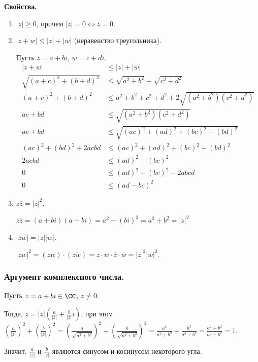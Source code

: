 \textbf{Свойства.}

\begin{enumerate}[label={\arabic*°.}]
    \item $|z| \geq 0$, причем $|z| = 0 \iff z = 0$.
    \item $|z + w| \leq |z| + |w|$ (неравенство треугольника).

    Пусть $z = a + bi$, $w = c + di$.
    \begin{align*}
        |z + w| &\leq |z| + |w| \\
        \sqrt{(a + c)^2 + (b + d)^2} &\leq \sqrt{a^2 + b^2} + \sqrt{c^2 + d^2} \\
        (a + c)^2 + (b + d)^2 &\leq a^2 + b^2 + c^2 + d^2 + 2\sqrt{(a^2 + b^2)(c^2 + d^2)} \\
        ac + bd &\leq\sqrt{(a^2 + b^2)(c^2 + d^2)} \\
        ac + bd &\leq\sqrt{(ac)^2 + (ad)^2 + (bc)^2 + (bd)^2} \\
        (ac)^2 + (bd)^2 + 2acbd &\leq (ac)^2 + (ad)^2 + (bc)^2 + (bd)^2 \\
        2acbd &\leq (ad)^2 + (bc)^2 \\
        0 &\leq (ad)^2 + (bc)^2 - 2abcd \\
        0 &\leq (ad - bc)^2
    \end{align*}
    \item $z \overline{z} = |z|^2$.

    $z \overline{z} = (a + bi)(a - bi) = a^2 - (bi)^2 = a^2 + b^2 = |z|^2$
    \item $|zw| = |z||w|$.

    $|zw|^2 = (zw) \cdot (\overline{zw}) = z \cdot w \cdot \overline{z} \cdot \overline{w} = |z|^2 |w|^2$.
\end{enumerate}

\subsubsection{
    Аргумент комплексного числа.
}

Пусть $z = a + bi \in \CC$, $z \neq 0$.

Тогда, $z = |z| \left(\frac{a}{|z|} + \frac{b}{|z|}i\right)$, при этом $\left(\frac{a}{|z|}\right)^2 + \left(\frac{b}{|z|}\right)^2 = (\frac{a}{\sqrt{a^2 + b^2}})^2 + (\frac{b}{\sqrt{a^2 + b^2}})^2 = \frac{a^2}{a^2 + b^2} + \frac{b^2}{a^2 + b^2} = \frac{a^2 + b^2}{a^2 + b^2} = 1.$

Значит, $\frac{a}{|z|}$ и $\frac{b}{|z|}$ являются синусом и косинусом некоторого угла.

